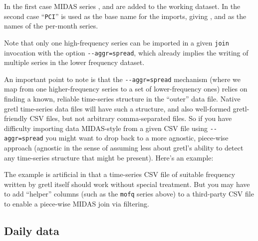 In the first case MIDAS series , 
and  are added to the working dataset. In the second
case ``\texttt{PCI}'' is used as the base name for the imports,
giving ,  and 
as the names of the per-month series.

Note that only one high-frequency series can be imported in a given
\texttt{join} invocation with the option \verb|--aggr=spread|, which
already implies the writing of multiple series in the lower frequency
dataset.

An important point to note is that the \verb|--aggr=spread| mechanism
(where we map from one higher-frequency series to a set of
lower-frequency ones) relies on finding a known, reliable time-series
structure in the ``outer'' data file. Native gretl time-series data
files will have such a structure, and also well-formed gretl-friendly
CSV files, but not arbitrary comma-separated files.  So if you have
difficulty importing data MIDAS-style from a given CSV file using
\verb|--aggr=spread| you might want to drop back to a more agnostic,
piece-wise approach (agnostic in the sense of assuming less about
gretl's ability to detect any time-series structure that might be
present). Here's an example:
%

The example is artificial in that a time-series CSV file of suitable
frequency written by gretl itself should work without special
treatment. But you may have to add ``helper'' columns (such as the
\texttt{mofq} series above) to a third-party CSV file to enable a
piece-wise MIDAS join via filtering.


\subsection{Daily data}
\label{sec:midas-daily}

